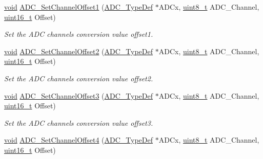 \begin{DoxyCompactItemize}
\hyperlink{group___n_a_m_e_ga18028b8badbf1ea7e704ccac3c488e82}{void} \hyperlink{group___a_d_c___exported___constants_ga4f20591341283023748a21a60749aeab}{A\-D\-C\-\_\-\-Set\-Channel\-Offset1} (\hyperlink{struct_a_d_c___type_def}{A\-D\-C\-\_\-\-Type\-Def} $\ast$A\-D\-Cx, \hyperlink{stdint_8h_aba7bc1797add20fe3efdf37ced1182c5}{uint8\-\_\-t} A\-D\-C\-\_\-\-Channel, \hyperlink{stdint_8h_a273cf69d639a59973b6019625df33e30}{uint16\-\_\-t} Offset)
\begin{DoxyCompactList}\small\item\em Set the A\-D\-C channels conversion value offset1. \end{DoxyCompactList}\item 
\hyperlink{group___n_a_m_e_ga18028b8badbf1ea7e704ccac3c488e82}{void} \hyperlink{group___a_d_c___exported___constants_gadb4b2f0c8dfd60374fececc11eacff77}{A\-D\-C\-\_\-\-Set\-Channel\-Offset2} (\hyperlink{struct_a_d_c___type_def}{A\-D\-C\-\_\-\-Type\-Def} $\ast$A\-D\-Cx, \hyperlink{stdint_8h_aba7bc1797add20fe3efdf37ced1182c5}{uint8\-\_\-t} A\-D\-C\-\_\-\-Channel, \hyperlink{stdint_8h_a273cf69d639a59973b6019625df33e30}{uint16\-\_\-t} Offset)
\begin{DoxyCompactList}\small\item\em Set the A\-D\-C channels conversion value offset2. \end{DoxyCompactList}\item 
\hyperlink{group___n_a_m_e_ga18028b8badbf1ea7e704ccac3c488e82}{void} \hyperlink{group___a_d_c___exported___constants_ga28b79ee61642eb26f91732592ae911df}{A\-D\-C\-\_\-\-Set\-Channel\-Offset3} (\hyperlink{struct_a_d_c___type_def}{A\-D\-C\-\_\-\-Type\-Def} $\ast$A\-D\-Cx, \hyperlink{stdint_8h_aba7bc1797add20fe3efdf37ced1182c5}{uint8\-\_\-t} A\-D\-C\-\_\-\-Channel, \hyperlink{stdint_8h_a273cf69d639a59973b6019625df33e30}{uint16\-\_\-t} Offset)
\begin{DoxyCompactList}\small\item\em Set the A\-D\-C channels conversion value offset3. \end{DoxyCompactList}\item 
\hyperlink{group___n_a_m_e_ga18028b8badbf1ea7e704ccac3c488e82}{void} \hyperlink{group___a_d_c___exported___constants_ga331ec41f03611b841535f9f6fde56aee}{A\-D\-C\-\_\-\-Set\-Channel\-Offset4} (\hyperlink{struct_a_d_c___type_def}{A\-D\-C\-\_\-\-Type\-Def} $\ast$A\-D\-Cx, \hyperlink{stdint_8h_aba7bc1797add20fe3efdf37ced1182c5}{uint8\-\_\-t} A\-D\-C\-\_\-\-Channel, \hyperlink{stdint_8h_a273cf69d639a59973b6019625df33e30}{uint16\-\_\-t} Offset)

\end{DoxyCompactItemize}
